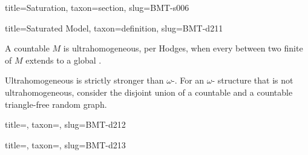 \documentclass[a4paper]{article}
\begin{document}
\begin{tree}{title={Saturation}, taxon={section}, slug={BMT-s006}}
\begin{tree}{title={Saturated Model}, taxon={definition}, slug={BMT-d211}}

    A countable  \(M\) is ultrahomogeneous, per Hodges, when every  between two finite  of \(M\) extends to a global .

    Ultrahomogeneous is strictly stronger than \(\omega\)-. For an \(\omega\)- structure that is not ultrahomogeneous, consider the disjoint union of a countable  and a countable triangle-free random graph.

\end{tree}

\begin{tree}{title={}, taxon={}, slug={BMT-d212}}

\end{tree}

\begin{tree}{title={}, taxon={}, slug={BMT-d213}}

\end{tree}

\end{tree}


  
  
\end{document}
